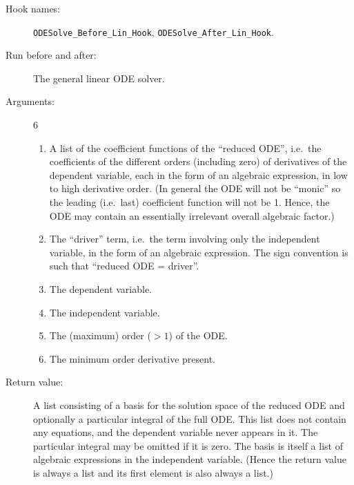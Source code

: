 \noindent\hrulefill
\pagebreak

\begin{description}
\item[Hook names:] \verb|ODESolve_Before_Lin_Hook|,
\verb|ODESolve_After_Lin_Hook|.
\item[Run before and after:] The general linear ODE solver.
\item[Arguments:] 6
\begin{enumerate}
\item A list of the coefficient functions of the ``reduced ODE'',
i.e.\ the coefficients of the different orders (including zero) of
derivatives of the dependent variable, each in the form of an
algebraic expression, in low to high derivative order.  (In general
the ODE will not be ``monic'' so the leading (i.e.\ last) coefficient
function will not be 1.  Hence, the ODE may contain an essentially
irrelevant overall algebraic factor.)
\item The ``driver'' term, i.e.\ the term involving only the
independent variable, in the form of an algebraic expression.  The
sign convention is such that ``reduced ODE = driver''.
\item The dependent variable.
\item The independent variable.
\item The (maximum) order ($> 1$) of the ODE.
\item The minimum order derivative present.
\end{enumerate}
\item[Return value:] A list consisting of a basis for the solution
space of the reduced ODE and optionally a particular integral of the
full ODE\@.  This list does not contain any equations, and the dependent
variable never appears in it.  The particular integral may be omitted
if it is zero.  The basis is itself a list of algebraic expressions in
the independent variable.  (Hence the return value is always a list
and its first element is also always a list.)
\end{description}

\noindent\hrulefill

